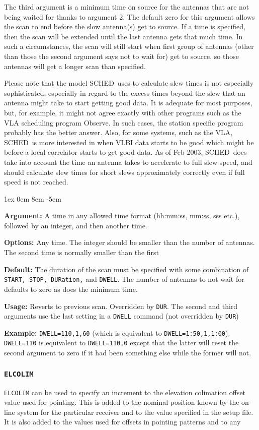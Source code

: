 \documentclass{report}
\newcommand{\schedb}{{\sc SCHED~}}
\newcommand{\rcwbox}[5]{
  \begin{list}{}{\parsep 1ex  \itemsep 0em
                 \leftmargin 8em  \itemindent -5em }
    \item {\bf Argument:} #1
    \item {\bf Options:}  #2
    \item {\bf Default:}  #3
    \item {\bf Usage:}    #4
    \item {\bf Example:}  #5
  \end{list}
}
\begin{document}
The third argument is a minimum time on source for the antennas that
are not being waited for thanks to argument 2.  The default zero for
this argument allows the scan to end before the slow antenna(s) get to
source.  If a time is specified, then the scan will be extended until
the last antenna gets that much time.  In such a circumstances, the
scan will still start when first group of antennas (other than those
the second argument says not to wait for) get to source, so those
antennas will get a longer scan than specified.

Please note that the model \schedb uses to calculate slew times is
not especially sophisticated, especially in regard to the excess
times beyond the slew that an antenna might take to start getting
good data.  It is adequate for most purposes, but, for example, it
might not agree exactly with other programs such as the VLA
scheduling program Observe.  In such cases, the station specific
program probably has the better answer.  Also, for some systems,
such as the VLA, \schedb is more interested in when VLBI data
starts to be good which might be before a local correlator starts
to get good data.  As of Feb 2003, \schedb does take into account
the time an antenna takes to accelerate to full slew speed, and
should calculate slew times for short slews approximately correctly
even if full speed is not reached.

\rcwbox
{A time in any allowed time format (hh:mm:ss, mm:ss, sss etc.), followed
by an integer, and then another time.}
{Any time.  The integer should be smaller than the number of antennas.  The
second time is normally smaller than the first}
{The duration of the scan must be specified with some combination of
{\tt START, STOP, DURation,} and {\tt DWELL}.  The number of antennas to
not wait for defaults to zero as does the minimum time.}
{Reverts to previous scan.  Overridden by {\tt DUR}.  The second and
third arguments use the last setting in a {\tt DWELL} command (not
overridden by {\tt DUR})}
{{\tt DWELL=110,1,60} (which is equivalent to {\tt DWELL=1:50,1,1:00}).
{\tt DWELL=110} is equivalent to {\tt DWELL=110,0} except that the
latter will reset the second argument to zero if it had been something
else while the former will not.}


\subsubsection{\label{MP:ELCOLIM}\tt ELCOLIM}

{\tt ELCOLIM} can be used to specify an
increment to the elevation colimation offset value used for pointing.
This is added to the nominal position known by the on-line system
for the particular receiver and to the value specified in the setup
file.  It is also added to the values used for offsets in pointing
patterns and to any 
\end{document}
